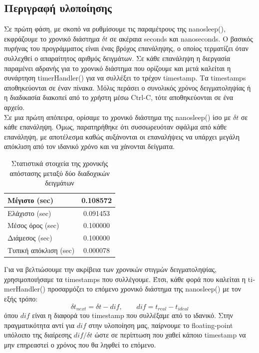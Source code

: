 \documentclass[a4paper,12pt]{article}
\begin{document}
\subsection{Περιγραφή υλοποίησης}
Σε πρώτη φάση, με σκοπό να ρυθμίσουμε τις παραμέτρους της \textlatin{nanosleep()}, εκφράζουμε το χρονικό διάστημα $\delta t$ σε ακέραια \textlatin{seconds} και \textlatin{nanoseconds}. Ο βασικός πυρήνας του προγράμματος είναι ένας βρόχος επανάληψης, ο οποίος τερματίζει όταν συλλεχθεί ο απαραίτητος αριθμός δειγμάτων. Σε κάθε επανάληψη η διεργασία παραμένει αδρανής για το χρονικό διάστημα που ορίζουμε και μετά καλείται η συνάρτηση \textlatin{timerHandler()} για να συλλέξει το τρέχον \textlatin{timestamp}. Τα \textlatin{timestamps} αποθηκεύονται σε έναν πίνακα. Μόλις περάσει ο συνολικός χρόνος δειγματοληψίας ή η διαδικασία διακοπεί από το χρήστη μέσω \textlatin{Ctrl-C}, τότε αποθηκεύονται σε ένα αρχείο. \\
Σε μια πρώτη απόπειρα, ορίσαμε το χρονικό διάστημα της \textlatin{nanosleep()} ίσο με $\delta t$ σε κάθε επανάληψη. Όμως, παρατηρήθηκε ότι συσσωρευόταν σφάλμα από κάθε επανάληψη, με αποτέλεσμα καθώς αυξάνονται οι επαναλήψεις να υπάρχει μεγάλη απόκλιση από τον ιδανικό χρόνο και να χάνονται δείγματα. 
\begin{table}
	\centering
	\begin{tabular}{ ||p{4cm}|c|| }
		\hline
		Μέγιστο \textlatin{(sec)} & 0.108572 \\
		\hline
		Ελάχιστο \textlatin{(sec)} & 0.091453 \\
		\hline
		Μέσος όρος \textlatin{(sec)} & 0.100000 \\
		\hline
		Διάμεσος \textlatin{(sec)} & 0.100000 \\
		\hline
		Τυπική απόκλιση \textlatin{(sec)} & 0.000078 \\
		\hline
	\end{tabular}
	\caption{Στατιστικά στοιχεία της χρονικής απόστασης μεταξύ δύο διαδοχικών δειγμάτων}\label{tab:stats1}
\end{table}

Για να βελτιώσουμε την ακρίβεια των χρονικών στιγμών δειγματοληψίας, χρησιμοποιήσαμε τα \textlatin{timestamps} που συλλέγουμε. Έτσι, κάθε φορά που καλείται η \textlatin{timerHandler()} προσαρμόζει το επόμενο χρονικό διάστημα της \textlatin{nanosleep()} με τον εξής τρόπο: 
$${\delta t}_{next} =  \delta t - dif, \qquad dif = t_{real} - t_{ideal}$$
όπου $dif$ είναι η διαφορά του \textlatin{timestamp} που συλλέξαμε από το ιδανικό. Στην πραγματικότητα αντί για $dif$ στην υλοποίηση μας, παίρνουμε το \textlatin{floating-point} υπόλοιπο της διαίρεσης $dif/{\delta t}$ ώστε σε περίπτωση που χαθεί κάποιο \textlatin{timestamp} να μην επηρεαστεί ο χρόνος που θα ληφθεί το επόμενο.
\end{document}
